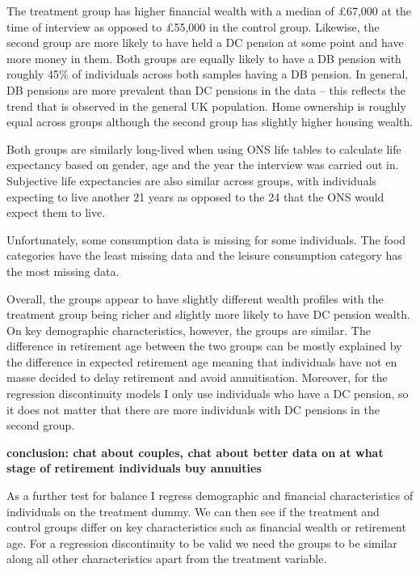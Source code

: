 \documentclass[12pt]{article}
\begin{document}
The treatment group has higher financial wealth with a median of £67,000 at the
time of interview as opposed to £55,000 in the control group. Likewise, the
second group are more likely to have held a DC pension at some point and have
more money in them. Both groups are equally likely to have a DB pension with
roughly 45\% of individuals across both samples having a DB pension. In general,
DB pensions are more prevalent than DC pensions in the data -- this reflects the
trend that is observed in the general UK population. Home ownership is roughly
equal across groups although the second group has slightly higher housing
wealth.

Both groups are similarly long-lived when using ONS life tables to calculate
life expectancy based on gender, age and the year the interview was carried out
in. Subjective life expectancies are also similar across groups, with
individuals expecting to live another 21 years as opposed to the 24 that the ONS
would expect them to live.

Unfortunately, some consumption data is missing for some individuals. The food
categories have the least missing data and the leisure consumption category has
the most missing data.

Overall, the groups appear to have slightly different wealth profiles with the
treatment group being richer and slightly more likely to have DC pension wealth.
On key demographic characteristics, however, the groups are similar. The
difference in retirement age between the two groups can be mostly explained by
the difference in expected retirement age meaning that individuals have not en
masse decided to delay retirement and avoid annuitisation. Moreover, for the
regression discontinuity models I only use individuals who have a DC pension, so
it does not matter that there are more individuals with DC pensions in the
second group.

\textbf{conclusion: chat about couples, chat about better data on at what
    stage of retirement individuals buy annuities}

\begin{landscape}
    \linespread{1.25}
    
    \normalsize
\end{landscape}


As a further test for balance I regress demographic and financial
characteristics of individuals on the treatment dummy. We can then see if the
treatment and control groups differ on key characteristics such as financial
wealth or retirement age. For a regression discontinuity to be valid we need the
groups to be similar along all other characteristics apart from the treatment
variable.
\end{document}
